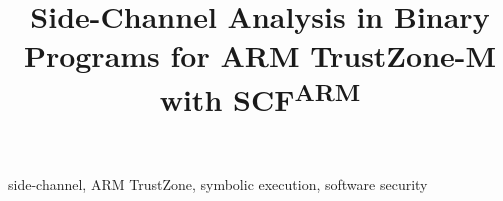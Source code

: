 \documentclass[compsoc, conference, a4paper, 10pt, times]{IEEEtran}
\newcommand{\tool}[0]{SCF\textsuperscript{ARM}{}}
\begin{document}
\title{Side-Channel Analysis in Binary Programs for ARM TrustZone-M with
\tool{}}


\iffalse
\author{\IEEEauthorblockN{1\textsuperscript{st} Given Names Surname}
\IEEEauthorblockA{\textit{Affiliation} \\
City, Country \\
email address or website URL}
\and
\IEEEauthorblockN{2\textsuperscript{nd} Given Names Surname}
\IEEEauthorblockA{\textit{Affiliation} \\
City, Country \\
email address or website URL}
\and
\IEEEauthorblockN{3\textsuperscript{rd} Given Names Surname}
\IEEEauthorblockA{\textit{Affiliation} \\
City, Country \\
email address or website URL}
}
\fi

\maketitle

\begin{abstract}
  
\end{abstract}

\begin{IEEEkeywords}
side-channel, ARM TrustZone, symbolic execution, software security
\end{IEEEkeywords}












\end{document}
